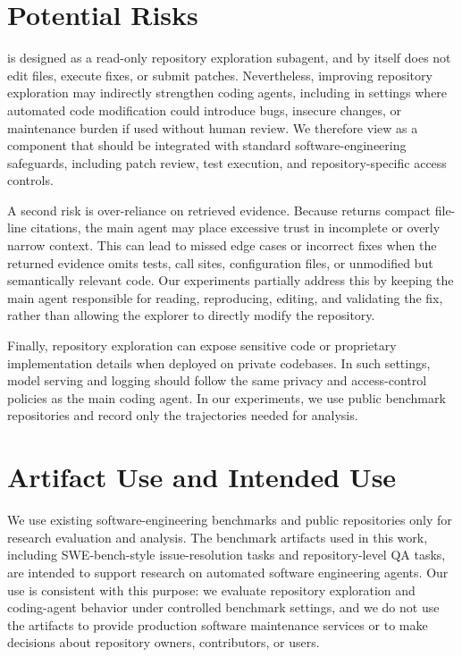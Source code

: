 \section{Potential Risks}

\approach is designed as a read-only repository exploration subagent, and by itself does not edit files, execute fixes, or submit patches. Nevertheless, improving repository exploration may indirectly strengthen coding agents, including in settings where automated code modification could introduce bugs, insecure changes, or maintenance burden if used without human review. We therefore view \approach as a component that should be integrated with standard software-engineering safeguards, including patch review, test execution, and repository-specific access controls.

A second risk is over-reliance on retrieved evidence. Because \approach returns compact file-line citations, the main agent may place excessive trust in incomplete or overly narrow context. This can lead to missed edge cases or incorrect fixes when the returned evidence omits tests, call sites, configuration files, or unmodified but semantically relevant code. Our experiments partially address this by keeping the main agent responsible for reading, reproducing, editing, and validating the fix, rather than allowing the explorer to directly modify the repository.

Finally, repository exploration can expose sensitive code or proprietary implementation details when deployed on private codebases. In such settings, model serving and logging should follow the same privacy and access-control policies as the main coding agent. In our experiments, we use public benchmark repositories and record only the trajectories needed for analysis.

\section{Artifact Use and Intended Use}

We use existing software-engineering benchmarks and public repositories only for research evaluation and analysis. The benchmark artifacts used in this work, including SWE-bench-style issue-resolution tasks and repository-level QA tasks, are intended to support research on automated software engineering agents. Our use is consistent with this purpose: we evaluate repository exploration and coding-agent behavior under controlled benchmark settings, and we do not use the artifacts to provide production software maintenance services or to make decisions about repository owners, contributors, or users.

